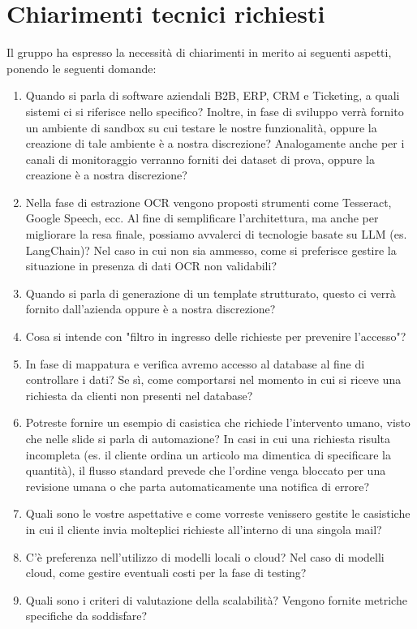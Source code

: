 \documentclass[11pt, a4paper]{article}
\begin{document}
\section{Chiarimenti tecnici richiesti}
Il gruppo ha espresso la necessità di chiarimenti in merito ai seguenti aspetti, ponendo le seguenti domande:
\begin{enumerate}
	\item Quando si parla di software aziendali B2B, ERP, CRM e Ticketing, a quali sistemi ci si riferisce nello specifico? Inoltre, in fase di sviluppo verrà fornito un ambiente di sandbox su cui testare le nostre funzionalità, oppure la creazione di tale ambiente è a nostra discrezione? Analogamente anche per i canali di monitoraggio verranno forniti dei dataset di prova, oppure la creazione è a nostra discrezione?
	\item Nella fase di estrazione OCR vengono proposti strumenti come Tesseract, Google Speech, ecc. Al fine di semplificare l’architettura, ma anche per migliorare la resa finale, possiamo avvalerci di tecnologie basate su LLM (es. LangChain)? Nel caso in cui non sia ammesso, come si preferisce gestire la situazione in presenza di dati OCR non validabili?
	\item Quando si parla di generazione di un template strutturato, questo ci verrà fornito dall’azienda oppure è a nostra discrezione?
	\item Cosa si intende con "filtro in ingresso delle richieste per prevenire l'accesso"?
	\item In fase di mappatura e verifica avremo accesso al database al fine di controllare i dati? Se sì, come comportarsi nel momento in cui si riceve una richiesta da clienti non presenti nel database?
	\item Potreste fornire un esempio di casistica che richiede l'intervento umano, visto che nelle slide si parla di automazione? In casi in cui una richiesta risulta incompleta (es. il cliente ordina un articolo ma dimentica di specificare la quantità), il flusso standard prevede che l'ordine venga bloccato per una revisione umana o che parta automaticamente una notifica di errore?
	\item Quali sono le vostre aspettative e come vorreste venissero gestite le casistiche in cui il cliente invia molteplici richieste all'interno di una singola mail?
	\item C'è preferenza nell'utilizzo di modelli locali o cloud? Nel caso di modelli cloud, come gestire eventuali costi per la fase di testing? 
	\item Quali sono i criteri di valutazione della scalabilità? Vengono fornite metriche specifiche da soddisfare?

\end{enumerate}
\end{document}
